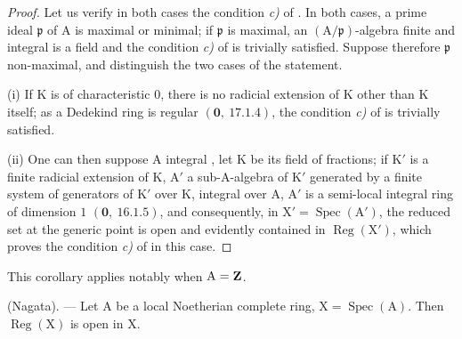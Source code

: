 \begin{proof}
Let us verify in both cases the condition \emph{c)} of . In both cases, a prime ideal
$\mathfrak{p}$ of $\mathrm{A}$ is maximal or minimal; if $\mathfrak{p}$ is maximal, an $(\mathrm{A}/\mathfrak{p})$-algebra finite and
integral is a field and the condition \emph{c)} of  is trivially satisfied. Suppose therefore
$\mathfrak{p}$ non-maximal, and distinguish the two cases of the statement.

(i) If $\mathrm{K}$ is of characteristic $0$, there is no radicial extension of $\mathrm{K}$ other than $\mathrm{K}$
itself; as a Dedekind ring is regular $(\mathbf{0},~17.1.4)$, the condition \emph{c)}
of  is trivially satisfied.

(ii) One can then suppose $\mathrm{A}$ integral , let $\mathrm{K}$ be its field of fractions; if $\mathrm{K}'$ is
a finite radicial extension of $\mathrm{K}$, $\mathrm{A}'$ a sub-$\mathrm{A}$-algebra of $\mathrm{K}'$ generated by a
finite system of generators of $\mathrm{K}'$ over $\mathrm{K}$, integral over $\mathrm{A}$, $\mathrm{A}'$ is a semi-local integral ring
of dimension $1$ $(\mathbf{0},~16.1.5)$, and consequently, in $\mathrm{X}'=\operatorname{Spec}(\mathrm{A}')$, the reduced set at the
generic point is open and evidently contained in $\operatorname{Reg}(\mathrm{X}')$, which proves the
condition \emph{c)} of  in this case.
\end{proof}

This corollary applies notably when $\mathrm{A}=\mathbf{Z}$.

\begin{theorem}[6.12.7]
\label{IV.6.12.7}
\textnormal{(Nagata).} --- Let $\mathrm{A}$ be a local Noetherian complete ring,
$\mathrm{X}=\operatorname{Spec}(\mathrm{A})$. Then $\operatorname{Reg}(\mathrm{X})$ is open in $\mathrm{X}$.
\end{theorem}

